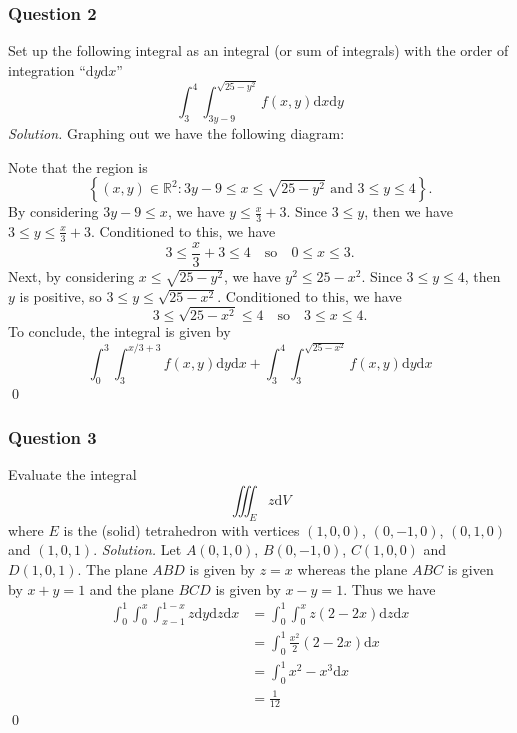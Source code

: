 \documentclass[12pt, twoside=false]{scrbook}
\newcounter{a}
\begin{document}
\subsubsection*{Question 2}
Set up the following integral as an integral (or sum of integrals) with the order of integration ``$\text{d}y\text{d}x$''
    $$\int_3^4\int_{3y-9}^{\sqrt{25-y^2}}f(x, y)\text{d}x\text{d}y$$
\textit{Solution.} 
Graphing out we have the following diagram:
\begin{center}
\end{center}
Note that the region is \[\left\{\left(x,y\right)\in\mathbb{R}^2:3y-9\le x\le \sqrt{25-y^2}\text{ and }3\le y\le 4\right\}.\]
By considering $3y-9\le x$, we have $y\le \frac{x}{3}+3$. Since $3\le y$, then we have $3\le y\le \frac{x}{3}+3$. Conditioned to this, we have \[3\le \frac{x}{3}+3\le 4\quad\text{so}\quad 0\le x\le 3.\]
Next, by considering $x\le \sqrt{25-y^2}$, we have $y^2\le 25-x^2$. Since $3\le y\le 4$, then $y$ is positive, so $3\le y\le \sqrt{25-x^2}$. Conditioned to this, we have \[3\le \sqrt{25-x^2}\le 4\quad\text{so}\quad 3 \le x \le 4.\]
To conclude, the integral is given by
$$\int_0^3\int_3^{x/3+3}f(x, y)\text{d}y\text{d}x+\int_3^4\int_3^{\sqrt{25-x^2}}f(x, y)\text{d}y\text{d}x$$ \qed 
\subsubsection*{Question 3}
    Evaluate the integral
    $$\iiint_Ez\text{d}V$$
    where $E$ is the (solid) tetrahedron with vertices $(1, 0, 0)$, $(0, -1, 0)$, $(0, 1, 0)$ and $(1, 0, 1)$.
\newline
\newline\textit{Solution.} Let $A(0, 1, 0)$, $B(0, -1, 0)$, $C(1, 0, 0)$ and $D(1, 0, 1)$. The plane $ABD$ is given by $z=x$ whereas the plane $ABC$ is given by $x+y=1$ and the plane $BCD$ is given by $x-y=1$. Thus we have 
\begin{align*}
    \int_0^1\int_0^x\int_{x-1}^{1-x}z\text{d}y\text{d}z\text{d}x &= \int_0^1\int_0^xz(2-2x)\text{d}z\text{d}x\\
    &= \int_0^1\frac{x^2}{2}(2-2x)\text{d}x\\
    &= \int_0^1x^2-x^3\text{d}x\\
    &= \frac{1}{12}
\end{align*} \qed 
\end{document}

